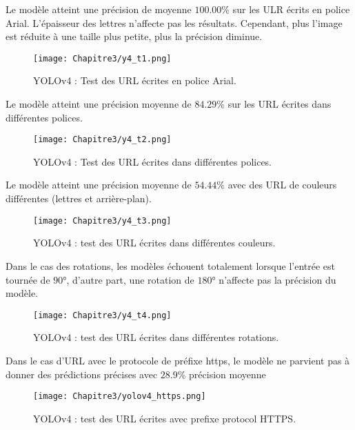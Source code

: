           Le modèle atteint une précision de moyenne $100.00\%$ sur les ULR écrits en police Arial. L'épaisseur des lettres n'affecte pas les résultats. Cependant, plus l'image est réduite à une taille plus petite, plus la précision diminue.
          \begin{figure}[H]
                    \centering
                    \texttt{[image: Chapitre3/y4\_t1.png]}
                    \caption{YOLOv4 : Test des URL écrites en police Arial.}
                    \label{y4_t1}
                    \end{figure}
               
          Le modèle atteint une précision moyenne de $84.29\%$ sur les URL écrites dans différentes polices.
          \begin{figure}[H]
                    \centering
                    \texttt{[image: Chapitre3/y4\_t2.png]}
                    \caption{YOLOv4 : Test des URL écrites dans différentes polices.}
                    \label{y4_t2}
                    \end{figure}

          Le modèle atteint une précision moyenne de $54.44\%$ avec des URL de couleurs différentes (lettres et arrière-plan).
          \begin{figure}[H]
                    \centering
                    \texttt{[image: Chapitre3/y4\_t3.png]}
                    \caption{YOLOv4 : test des URL écrites dans différentes couleurs.}
                    \label{y4_t3}
                    \end{figure}

          Dans le cas des rotations, les modèles échouent totalement lorsque l'entrée est tournée de $90°$, d'autre part, une rotation de $180°$ n'affecte pas la précision du modèle.
          \begin{figure}[H]
                    \centering
                    \texttt{[image: Chapitre3/y4\_t4.png]}
                    \caption{YOLOv4 : test des URL écrites dans différentes rotations.}
                    \label{y4_t4}
                    \end{figure}
               
          Dans le cas d'URL avec le protocole de préfixe https, le modèle ne parvient pas à donner des prédictions précises avec $28.9\%$ précision moyenne
          \begin{figure}[H]
                    \centering
                    \texttt{[image: Chapitre3/yolov4\_https.png]}
                    \caption{YOLOv4 : test des URL écrites avec prefixe protocol HTTPS.}
                    \label{y4_https}
                    \end{figure}
               
